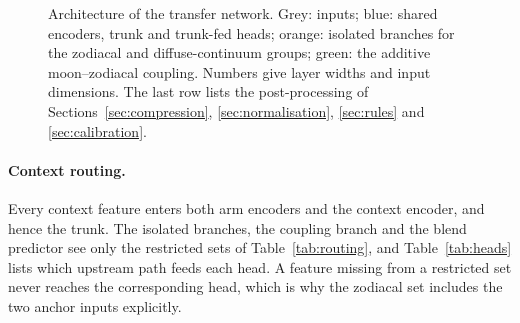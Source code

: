 \begin{figure}
\caption{Architecture of the transfer network. Grey: inputs; blue: shared
encoders, trunk and trunk-fed heads; orange: isolated branches for the
zodiacal and diffuse-continuum groups; green: the additive moon--zodiacal
coupling. Numbers give layer widths and input dimensions. The last row lists
the post-processing of Sections~\ref{sec:compression}, \ref{sec:normalisation},
\ref{sec:rules} and \ref{sec:calibration}.}
\label{fig:arch}
\end{figure}

\paragraph{Context routing.} Every context feature enters both arm encoders
and the context encoder, and hence the trunk. The isolated branches, the
coupling branch and the blend predictor see only the restricted sets of
Table~\ref{tab:routing}, and Table~\ref{tab:heads} lists which upstream path
feeds each head. A feature missing from a restricted set never reaches the
corresponding head, which is why the zodiacal set includes the two anchor
inputs explicitly.

